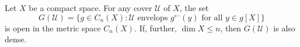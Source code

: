 Let $X$ be a compact space. For any cover $\mathcal{U}$ of $X$, the set
$$G(\mathcal{U}) = \{g \in C_n(X): \mathcal{U} \text{ envelops } g^\leftarrow(y) \text{ for all } y \in g[X]\}$$
is open in the metric space $C_n(X)$. If, further, $\dim X \leq n$, then $G(\mathcal{U})$ is also dense.
